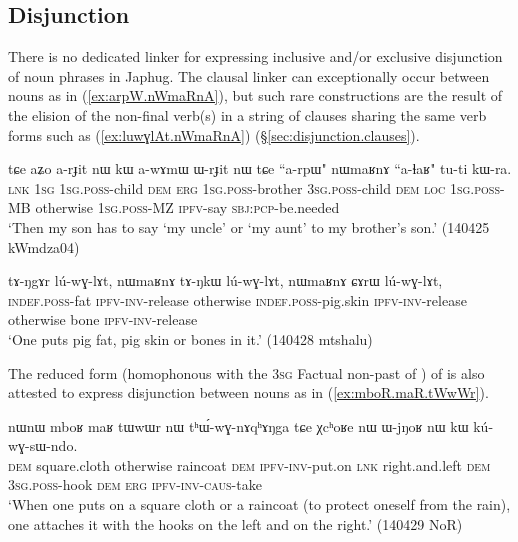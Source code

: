 \subsection{Disjunction}  \label{sec:disjunction.nouns}
There is no dedicated linker for expressing inclusive and/or exclusive disjunction of noun phrases in Japhug. The clausal linker  can exceptionally occur between nouns as in (\ref{ex:arpW.nWmaRnA}), but such rare constructions are the result of the elision of the non-final verb(s) in a string of clauses sharing the same verb forms such as (\ref{ex:luwɣlAt.nWmaRnA}) (§\ref{sec:disjunction.clauses}).

\begin{exe}
\ex \label{ex:arpW.nWmaRnA}
 \gll tɕe aʑo a-rɟit nɯ kɯ a-wɤmɯ ɯ-rɟit nɯ tɕe ``a-rpɯ" nɯmaʁnɤ ``a-ɬaʁ" tu-ti kɯ-ra. \\
 \textsc{lnk} \textsc{1sg} \textsc{1sg}.\textsc{poss}-child \textsc{dem} \textsc{erg} \textsc{1sg}.\textsc{poss}-brother \textsc{3sg}.\textsc{poss}-child \textsc{dem} \textsc{loc} \textsc{1sg}.\textsc{poss}-MB otherwise \textsc{1sg}.\textsc{poss}-MZ \textsc{ipfv}-say \textsc{sbj}:\textsc{pcp}-be.needed \\
\glt `Then my son has to say `my uncle' or `my aunt' to my brother's son.'  (140425 kWmdza04) 
 \end{exe}
 
 \begin{exe}
\ex \label{ex:luwɣlAt.nWmaRnA}
 \gll  tɤ-ŋgɤr lú-wɣ-lɤt, nɯmaʁnɤ tɤ-ŋkɯ lú-wɣ-lɤt, nɯmaʁnɤ ɕɤrɯ lú-wɣ-lɤt, \\
 \textsc{indef}.\textsc{poss}-fat \textsc{ipfv}-\textsc{inv}-release otherwise  \textsc{indef}.\textsc{poss}-pig.skin  \textsc{ipfv}-\textsc{inv}-release otherwise bone \textsc{ipfv}-\textsc{inv}-release \\
\glt `One puts pig fat, pig skin or bones in it.' (140428 mtshalu) 	
 \end{exe}

The reduced form  (homophonous with the \textsc{3sg} Factual non-past of ) of   is also attested to express disjunction between nouns as in (\ref{ex:mboR.maR.tWwWr}).

 \begin{exe}
\ex \label{ex:mboR.maR.tWwWr}
 \gll  nɯnɯ mboʁ maʁ tɯwɯr nɯ tʰɯ́-wɣ-nɤqʰɤŋga tɕe χcʰoʁe nɯ ɯ-jŋoʁ nɯ kɯ kú-wɣ-sɯ-ndo. \\
 \textsc{dem} square.cloth otherwise raincoat \textsc{dem} \textsc{ipfv}-\textsc{inv}-put.on \textsc{lnk} right.and.left \textsc{dem} \textsc{3sg}.\textsc{poss}-hook \textsc{dem} \textsc{erg} \textsc{ipfv}-\textsc{inv}-\textsc{caus}-take \\
 \glt `When one puts on a square cloth or a raincoat (to protect oneself from the rain), one attaches it with the hooks on the left and on the right.' (140429 NoR)
  \end{exe}

